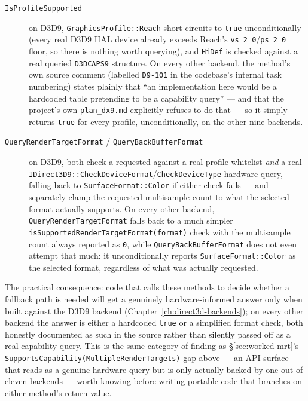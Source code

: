 \begin{description}
\item[\texttt{IsProfileSupported}] on D3D9, \texttt{GraphicsProfile::Reach} short-circuits to
  \texttt{true} unconditionally (every real D3D9 HAL device already exceeds Reach's
  \texttt{vs\_2\_0}/\texttt{ps\_2\_0} floor, so there is nothing worth querying), and
  \texttt{HiDef} is checked against a real queried \texttt{D3DCAPS9} structure. On every other
  backend, the method's own source comment (labelled \texttt{D9-101} in the codebase's internal
  task numbering) states plainly that ``an implementation here would be a hardcoded table
  pretending to be a capability query'' --- and that the project's own \texttt{plan\_dx9.md}
  explicitly refuses to do that --- so it simply returns \texttt{true} for every profile,
  unconditionally, on the other nine backends.
\item[\texttt{QueryRenderTargetFormat} / \texttt{QueryBackBufferFormat}] on D3D9, both check a
  requested  against a real profile whitelist \emph{and} a real
  \texttt{IDirect3D9::CheckDeviceFormat}/\texttt{CheckDeviceType} hardware query, falling back
  to \texttt{SurfaceFormat::Color} if either check fails --- and separately clamp the requested
  multisample count to what the selected format actually supports. On every other backend,
  \texttt{QueryRenderTargetFormat} falls back to a much simpler
  \texttt{isSupportedRenderTargetFormat(format)} check with the multisample count always
  reported as \texttt{0}, while \texttt{QueryBackBufferFormat} does not even attempt that much:
  it unconditionally reports \texttt{SurfaceFormat::Color} as the selected format, regardless
  of what was actually requested.
\end{description}

The practical consequence: code that calls these methods to decide whether a fallback path is
needed will get a genuinely hardware-informed answer only when built against the D3D9 backend
(Chapter~\ref{ch:direct3d-backends}); on every other backend the answer is either a hardcoded
\texttt{true} or a simplified format check, both honestly documented as such in the source
rather than silently passed off as a real capability query. This is the same category of
finding as \S\ref{sec:worked-mrt}'s \texttt{SupportsCapability(MultipleRenderTargets)} gap
above --- an API surface that reads as a genuine hardware query but is only actually backed by
one out of eleven backends --- worth knowing before writing portable code that branches on
either method's return value.

